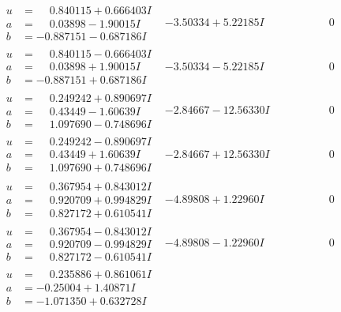 \documentclass[1p]{elsarticle_modified}
\theoremstyle{definition}
\begin{document}
$$\begin{array}{c|c|c}
\begin{aligned}
u &= \phantom{-}0.840115 + 0.666403 I \\
a &= \phantom{-}0.03898 - 1.90015 I \\
b &= -0.887151 - 0.687186 I\end{aligned}
 & -3.50334 + 5.22185 I & \phantom{-0.000000 } 0 \\ \hline\begin{aligned}
u &= \phantom{-}0.840115 - 0.666403 I \\
a &= \phantom{-}0.03898 + 1.90015 I \\
b &= -0.887151 + 0.687186 I\end{aligned}
 & -3.50334 - 5.22185 I & \phantom{-0.000000 } 0 \\ \hline\begin{aligned}
u &= \phantom{-}0.249242 + 0.890697 I \\
a &= \phantom{-}0.43449 - 1.60639 I \\
b &= \phantom{-}1.097690 - 0.748696 I\end{aligned}
 & -2.84667 - 12.56330 I & \phantom{-0.000000 } 0 \\ \hline\begin{aligned}
u &= \phantom{-}0.249242 - 0.890697 I \\
a &= \phantom{-}0.43449 + 1.60639 I \\
b &= \phantom{-}1.097690 + 0.748696 I\end{aligned}
 & -2.84667 + 12.56330 I & \phantom{-0.000000 } 0 \\ \hline\begin{aligned}
u &= \phantom{-}0.367954 + 0.843012 I \\
a &= \phantom{-}0.920709 + 0.994829 I \\
b &= \phantom{-}0.827172 + 0.610541 I\end{aligned}
 & -4.89808 + 1.22960 I & \phantom{-0.000000 } 0 \\ \hline\begin{aligned}
u &= \phantom{-}0.367954 - 0.843012 I \\
a &= \phantom{-}0.920709 - 0.994829 I \\
b &= \phantom{-}0.827172 - 0.610541 I\end{aligned}
 & -4.89808 - 1.22960 I & \phantom{-0.000000 } 0 \\ \hline\begin{aligned}
u &= \phantom{-}0.235886 + 0.861061 I \\
a &= -0.25004 + 1.40871 I \\
b &= -1.071350 + 0.632728 I\end{aligned}

\end{array}$$
\end{document}
